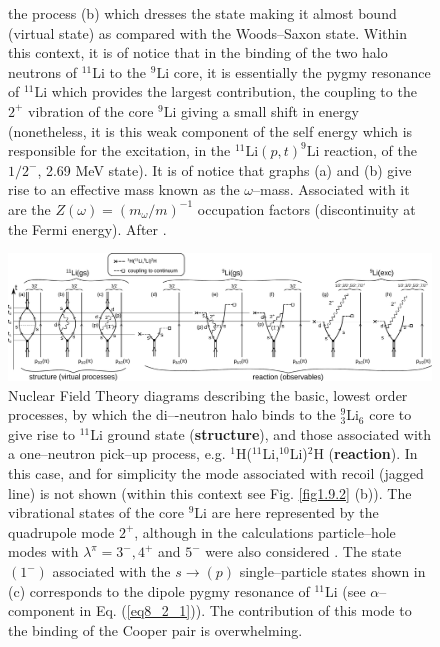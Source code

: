 \begin{figure}
{the process (b) which dresses the state making it almost bound (virtual state) as compared with the Woods--Saxon state.
Within this context, it is of notice that in the binding of the two halo neutrons of $^{11}$Li to the $^9$Li core, it is essentially the
pygmy resonance of $^{11}$Li which provides the largest contribution, the coupling to the $2^+$ vibration of the core $^9$Li giving a
small shift in energy (nonetheless, it is this weak component of the self energy which is responsible for the excitation, in the
$^{11}$Li$(p, t)^9$Li reaction, of the $1/2^−$, 2.69 MeV state).  It is of notice that graphs (a) and (b) give rise to an effective mass known as the $\omega$--mass. Associated with it are the
$Z(\omega) = (m_\omega/m)^{-1}$ occupation factors (discontinuity at the Fermi energy). After \cite{Potel:14}.}\label{fig6.2.4x}
\end{figure}
 \begin{figure}
\centerline{\includegraphics*[width=19 cm,angle=0]{C6/figs_C6/diagrams}}
\caption{Nuclear Field Theory diagrams describing the basic, lowest order processes, by which the di–-neutron halo binds to the $^9_3$Li$_6$ core to give rise to $^{11}$Li ground state 
(\textbf{structure}), and those associated with a one--neutron pick--up process, e.g.  $^1$H($^{11}$Li,$^{10}$Li)$^2$H (\textbf{reaction}). In this case, and for simplicity the mode associated with recoil (jagged line) is not shown (within this context see Fig. \ref{fig1.9.2} (b)). The vibrational states of the core $^9$Li are here represented by the quadrupole mode $2^+$, although in the calculations particle--hole modes with $\lambda^{\pi}=3^-,4^+$ and $5^-$ were also considered . The state $(1^-)$ associated with the $s\rightarrow(p)$ single--particle states shown in (c) corresponds to the  dipole pygmy resonance of $^{11}$Li (see $\alpha$--component in Eq. (\ref{eq8_2_1})). The contribution of this mode to the binding of the Cooper pair is overwhelming.}\label{fig6.1.4x}
\end{figure}

